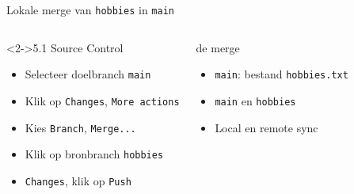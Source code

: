 \documentclass
[kulak,outline] %
{kulakbeamer}
\begin{document}
        \begin{frame}{Lokale merge van \texttt{hobbies} in \texttt{main}}
		\begin{columns}[T]
            \begin{block}<2->{5.1 Source Control}
				\begin{itemize}
                    \item Selecteer doelbranch \texttt{main}
					\item Klik op \texttt{Changes}, \texttt{More actions}
					\item Kies \texttt{Branch}, \texttt{Merge...}
					\item Klik op bronbranch \texttt{hobbies}
					\item<only@3-|alert@3> \texttt{Changes}, klik op \texttt{Push}
				\end{itemize}
			\end{block}
            \begin{exampleblock}{ de merge}
            \begin{itemize}
                 \item \texttt{main}:  bestand \texttt{hobbies.txt}
                 \item {} \texttt{main} en \texttt{hobbies} 
                 \item Local en remote  sync
			\end{itemize}
		    \end{exampleblock}
		\end{columns}
	\end{frame}
\end{document}
